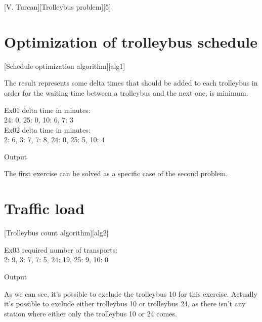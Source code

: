\documentclass{article}
\begin{document}
	\def \reportSubj{Trolleybus problem}
	[V. Turcan][\reportSubj][5]

	\section{Optimization of trolleybus schedule}
		\def \firstAlgCaption {Schedule optimization algorithm}
		[\firstAlgCaption][alg1]

		\par The result represents some delta times that should be added to each trolleybus in order for the waiting time between a trolleybus and the next one, is minimum.
		\begin{myFigure}
			\begin{flushleft}
				Ex01 delta time in minutes:\\
				{24: 0, 25: 0, 10: 6, 7: 3}\\
				\bigskip
				Ex02 delta time in minutes:\\
				{2: 6, 3: 7, 7: 8, 24: 0, 25: 5, 10: 4}\\
			\end{flushleft}
			\caption{Output}
		\end{myFigure}

		\par The first exercise can be solved as a specific case of the second problem.

	\section{Traffic load}
		\def \secondAlgCaption {Trolleybus count algorithm}
		[\secondAlgCaption][alg2]

		\begin{myFigure}
			\begin{flushleft}
				Ex03 required number of transports:\\
				{2: 9, 3: 7, 7: 5, 24: 19, 25: 9, 10: 0}
			\end{flushleft}
			\caption{Output}
		\end{myFigure}

		\par As we can see, it's possible to exclude the trolleybus 10 for this exercise. Actually it's possible to exclude either trolleybus 10 or trolleybus 24, as there isn't any station where either only the trolleybus 10 or 24 comes.
\end{document}
